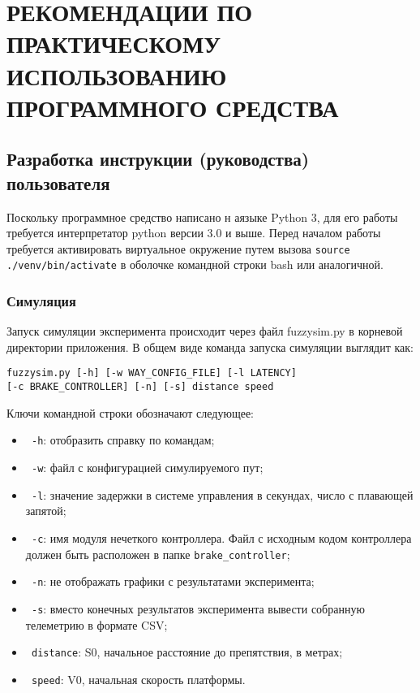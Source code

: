 \lstset{style=pythonstyle}

\section{РЕКОМЕНДАЦИИ ПО ПРАКТИЧЕСКОМУ ИСПОЛЬЗОВАНИЮ ПРОГРАММНОГО СРЕДСТВА}
\label{sec:manual}

\subsection{Разработка инструкции (руководства) пользователя}
\label{sub:manual:1}

Поскольку программное средство написано н аязыке Python 3, для его работы требуется интерпретатор python версии 3.0 и выше. Перед началом работы  требуется активировать виртуальное окружение путем вызова \lstinline!source ./venv/bin/activate! в оболочке командной строки bash или аналогичной.

\subsubsection{Симуляция }

Запуск симуляции эксперимента происходит через файл fuzzysim.py в корневой директории приложения. В общем виде команда запуска симуляции выглядит как:

\begin{lstlisting}[style=pythonstyle,caption={  }, label=lst:func:1]
  fuzzysim.py [-h] [-w WAY_CONFIG_FILE] [-l LATENCY]                   [-c BRAKE_CONTROLLER] [-n] [-s] distance speed
\end{lstlisting}

Ключи командной строки обозначают следующее:

\begin{itemize}
	\item \lstinline! -h!: отобразить справку по командам;
	\item \lstinline! -w!: файл с конфигурацией симулируемого пут;
	\item \lstinline! -l!: значение задержки в системе управления в секундах, число с плавающей запятой;
	\item \lstinline! -c!: имя модуля нечеткого контроллера. Файл с исходным кодом контроллера должен быть расположен в папке \lstinline!brake_controller!;
	\item \lstinline! -n!: не отображать графики с результатами эксперимента;
	\item \lstinline! -s!: вместо конечных результатов эксперимента вывести собранную телеметрию в формате CSV;
	\item \lstinline! distance!: S0, начальное расстояние до препятствия, в метрах;
	\item \lstinline! speed!: V0, начальная скорость платформы.
\end{itemize}

